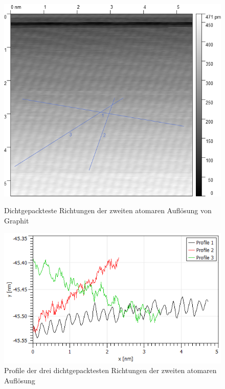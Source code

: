\documentclass[12pt,a4paper]{scrartcl}
\numberwithin{equation}{section} %
\begin{document}
\begin{figure}[h!]
	\begin{minipage}[t]{0.4\textwidth}
		\includegraphics[width=\linewidth]{../media/B2.5/Atoms2_with_profileLines.png}
		\caption{Dichtgepackteste Richtungen der zweiten atomaren Auflösung von Graphit}
		\label{abb:hopg_with_profile_2}
	\end{minipage}
	\begin{minipage}[t]{0.5\textwidth}
		\centering
		\includegraphics[width=\linewidth]{../media/B2.5/profilePlot_area2.png}
		\caption{Profile der drei dichtgepacktesten Richtungen der zweiten atomaren Auflösung}
		\label{abb:hopg_profile_2}
	\end{minipage}
\end{figure}
\end{document}

